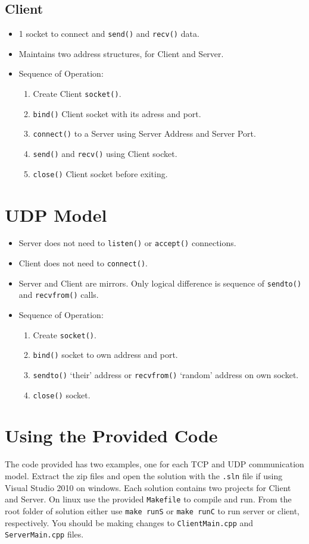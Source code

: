 \documentclass[12pt,a4paper]{article}
\begin{document}
\subsection{Client}
\begin{itemize}
\item 1 socket to connect and \verb|send()| and \verb|recv()| data.
\item Maintains two address structures, for Client and Server.
\item Sequence of Operation:
	\begin{enumerate}
    \item Create Client \verb|socket()|.
    \item \verb|bind()| Client socket with its adress and port.
    \item \verb|connect()| to a Server using Server Address and Server Port.
    \item \verb|send()| and \verb|recv()| using Client socket.
    \item \verb|close()| Client socket before exiting.
	\end{enumerate}
\end{itemize}
\section{UDP Model}
\begin{itemize}
\item Server does not need to \verb|listen()| or \verb|accept()| connections.
\item Client does not need to \verb|connect()|.
\item Server and Client are mirrors. Only logical difference is sequence of \verb|sendto()| and \verb|recvfrom()| calls.
\item Sequence of Operation:
	\begin{enumerate}
    \item Create \verb|socket()|.
    \item \verb|bind()| socket to own address and port.
    \item \verb|sendto()| `their' address or \verb|recvfrom()| `random' address on own socket.
    \item \verb|close()| socket.
    \end{enumerate}
\end{itemize}
\section{Using the Provided Code}
The code provided has two examples, one for each TCP and UDP communication model. Extract the zip files and open the solution with the \verb|.sln| file if using Visual Studio 2010 on windows. Each solution contains two projects for Client and Server. On linux use the provided \verb|Makefile| to compile and run. From the root folder of solution either use \verb|make runS| or \verb|make runC| to run server or client, respectively. You should be making changes to \verb|ClientMain.cpp| and \verb|ServerMain.cpp| files.
\end{document}
